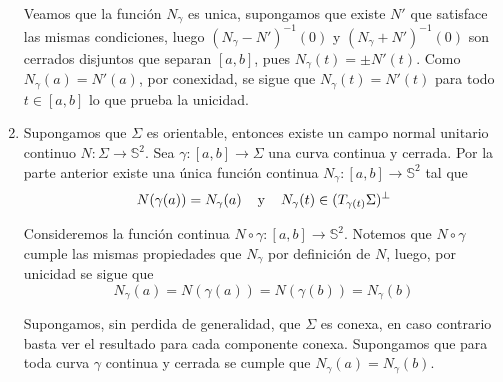 \documentclass{article}
\begin{document}
\begin{enumerate}
    \noindent Veamos que la función $N_{\gamma}$ es unica, supongamos que existe $N'$ que 
    satisface las mismas condiciones, luego $(N_{\gamma}-N')^{-1}(0)$ y $(N_{\gamma}+N')^{-1}(0)$
    son cerrados disjuntos que separan $[a,b]$, pues $N_{\gamma}(t)=\pm N'(t)$. Como 
    $N_{\gamma}(a)=N'(a)$, por conexidad, se sigue que $N_{\gamma}(t)=N'(t)$ para todo $t\in[a,b]$ 
    lo que prueba la unicidad.

    \item Supongamos que $\Sigma$ es orientable, entonces existe un campo normal unitario continuo
    $N:\Sigma\to\mathbb{S}^{2}$. Sea $\gamma:[a,b]\to\Sigma$ una curva continua y cerrada. Por la
    parte anterior existe una única función continua $N_{\gamma}:[a,b]\to\mathbb{S}^{2}$ tal que 
    \begin{equation*}
        N(\gamma(a))=N_{\gamma}(a)\hspace{4mm}\text{y}\hspace{4mm}
        N_{\gamma}(t)\in(T_{\gamma(t)}\Sigma)^{\perp}
    \end{equation*}
    
    \vspace{2mm}
    Consideremos la función continua $N\circ\gamma:[a,b]\to\mathbb{S}^{2}$. Notemos que 
    $N\circ\gamma$ cumple las mismas propiedades que $N_{\gamma}$ por definición de $N$, luego,
    por unicidad se sigue que
    \begin{equation*}
        N_{\gamma}(a)=N(\gamma(a))=N(\gamma(b))=N_{\gamma}(b)
    \end{equation*}

    
    \noindent Supongamos, sin perdida de generalidad, que $\Sigma$ es conexa, en caso contrario 
    basta ver el resultado para cada componente conexa. Supongamos que para toda curva $\gamma$ 
    continua y cerrada se cumple que $N_{\gamma}(a)=N_{\gamma}(b)$. 
    

\end{enumerate}
\end{document}
